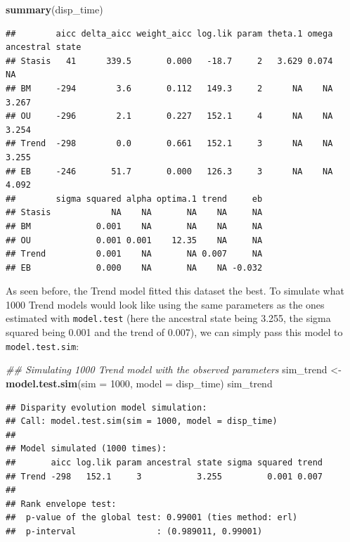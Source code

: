 \documentclass[
]{book}
\newenvironment{Shaded}{\begin{snugshade}}{\end{snugshade}}
\newcommand{\CommentTok}[1]{\textcolor[rgb]{0.56,0.35,0.01}{\textit{#1}}}
\newcommand{\DataTypeTok}[1]{\textcolor[rgb]{0.13,0.29,0.53}{#1}}
\newcommand{\DecValTok}[1]{\textcolor[rgb]{0.00,0.00,0.81}{#1}}
\newcommand{\KeywordTok}[1]{\textcolor[rgb]{0.13,0.29,0.53}{\textbf{#1}}}
\newcommand{\NormalTok}[1]{#1}
\newcommand{\StringTok}[1]{\textcolor[rgb]{0.31,0.60,0.02}{#1}}
\begin{document}
\begin{Shaded}
\begin{Highlighting}[]
\KeywordTok{summary}\NormalTok{(disp\_time)}
\end{Highlighting}
\end{Shaded}

\begin{verbatim}
##        aicc delta_aicc weight_aicc log.lik param theta.1 omega ancestral state
## Stasis   41      339.5       0.000   -18.7     2   3.629 0.074              NA
## BM     -294        3.6       0.112   149.3     2      NA    NA           3.267
## OU     -296        2.1       0.227   152.1     4      NA    NA           3.254
## Trend  -298        0.0       0.661   152.1     3      NA    NA           3.255
## EB     -246       51.7       0.000   126.3     3      NA    NA           4.092
##        sigma squared alpha optima.1 trend     eb
## Stasis            NA    NA       NA    NA     NA
## BM             0.001    NA       NA    NA     NA
## OU             0.001 0.001    12.35    NA     NA
## Trend          0.001    NA       NA 0.007     NA
## EB             0.000    NA       NA    NA -0.032
\end{verbatim}

As seen before, the Trend model fitted this dataset the best.
To simulate what 1000 Trend models would look like using the same parameters as the ones estimated with \texttt{model.test} (here the ancestral state being 3.255, the sigma squared being 0.001 and the trend of 0.007), we can simply pass this model to \texttt{model.test.sim}:

\begin{Shaded}
\begin{Highlighting}[]
\CommentTok{\#\# Simulating 1000 Trend model with the observed parameters}
\NormalTok{sim\_trend \textless{}{-}}\StringTok{ }\KeywordTok{model.test.sim}\NormalTok{(}\DataTypeTok{sim =} \DecValTok{1000}\NormalTok{, }\DataTypeTok{model =}\NormalTok{ disp\_time)}
\NormalTok{sim\_trend}
\end{Highlighting}
\end{Shaded}

\begin{verbatim}
## Disparity evolution model simulation:
## Call: model.test.sim(sim = 1000, model = disp_time) 
## 
## Model simulated (1000 times):
##       aicc log.lik param ancestral state sigma squared trend
## Trend -298   152.1     3           3.255         0.001 0.007
## 
## Rank envelope test:
##  p-value of the global test: 0.99001 (ties method: erl)
##  p-interval                : (0.989011, 0.99001)
\end{verbatim}
\end{document}
